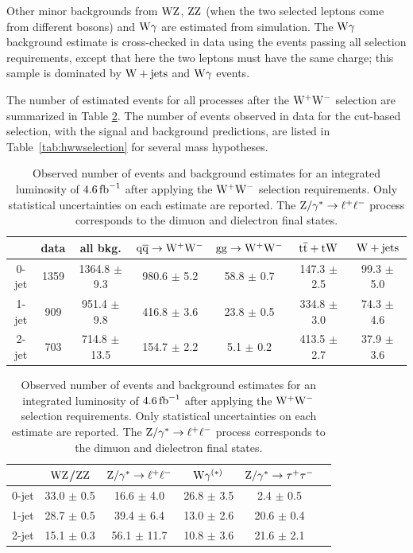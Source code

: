 \documentclass[11pt,twoside,a4paper,cmspaper,final,collab]{cms-tdr}
\begin{document}
Other minor backgrounds from $\mathrm{W}\mathrm{Z}$, $\mathrm{Z}\mathrm{Z}$ (when the two selected leptons come from
different bosons) and $\mathrm{W}\gamma$ are estimated from simulation.
The $\mathrm{W}\gamma$ background estimate is cross-checked in data using the events passing
all selection requirements, except that here the two leptons must have the
same charge; this sample is dominated by $\mathrm{W}+\mathrm{jets}$ and $\mathrm{W}\gamma$
events.

The number of estimated events for all processes after the $\mathrm{W^+}{}\mathrm{W^-}$ selection
are summarized in Table \ref{tab:wwselection_all}. The number of events
observed in data for the cut-based selection, with the signal and
background predictions, are listed in Table~\ref{tab:hwwselection} for several
mass hypotheses.

\begin{table}[htbp]
  \begin{center}
    \caption{Observed number of events and background estimates for
    an integrated luminosity of $4.6\mbox{\ensuremath{\,\text{fb}^\text{$-$1}}}$ after applying the $\mathrm{W^+}{}\mathrm{W^-}$ selection requirements.
    Only statistical uncertainties on each estimate are reported.
    The $\mathrm{Z}/\gamma^*\to \ell^+\ell^-$ process corresponds to the dimuon and dielectron final states.}
     {
     \small
     \setlength{\extrarowheight}{1pt}
      \begin{tabular} {|c|c|c|c|c|c|c|}
\hline
          &   data & all bkg. & $\mathrm{q}\mathrm{\overline{q}} \to \mathrm{W^+}{}\mathrm{W^-}$ & $\mathrm{g}\mathrm{g} \to \mathrm{W^+}{}\mathrm{W^-}$ &  $\mathrm{t}\overline{\mathrm{t}}+\mathrm{t}\mathrm{W}$   & $\mathrm{W}+\mathrm{jets}$    \\
  \hline
  \hline
 0-jet & 1359 & 1364.8 $\pm$    9.3 &  980.6 $\pm$    5.2 &   58.8 $\pm$    0.7 &  147.3 $\pm$    2.5 &   99.3 $\pm$    5.0 \\
 1-jet &  909 &  951.4 $\pm$    9.8 &  416.8 $\pm$    3.6 &   23.8 $\pm$    0.5 &  334.8 $\pm$    3.0 &   74.3 $\pm$	4.6  \\
 2-jet &  703 &  714.8 $\pm$   13.5 &  154.7 $\pm$    2.2 &    5.1 $\pm$    0.2 &  413.5 $\pm$    2.7 &   37.9 $\pm$	3.6  \\
 \hline
 \hline
  \end{tabular}

  \begin{tabular} {|c|c|c|c|c|c|}
  \hline
       & $\mathrm{W}\mathrm{Z}$/$\mathrm{Z}\mathrm{Z}$ & $\mathrm{Z}/\gamma^*\to \ell^+\ell^-$ & $\mathrm{W}\gamma^{(*)}$ & $\mathrm{Z}/\gamma^* \to\tau^+\tau^-$ \\
       \hline
       \hline
       0-jet & 33.0 $\pm$ 0.5  & 16.6 $\pm$    4.0 &   26.8 $\pm$    3.5 &    2.4 $\pm$    0.5 \\
       1-jet & 28.7 $\pm$ 0.5  & 39.4 $\pm$    6.4 &   13.0 $\pm$    2.6 &   20.6 $\pm$    0.4 \\
       2-jet & 15.1 $\pm$ 0.3  & 56.1 $\pm$   11.7 &   10.8 $\pm$    3.6 &   21.6 $\pm$    2.1 \\
       \hline
       \hline
       \end{tabular}
  }
   \label{tab:wwselection_all}
  \end{center}
\end{table}
\end{document}
